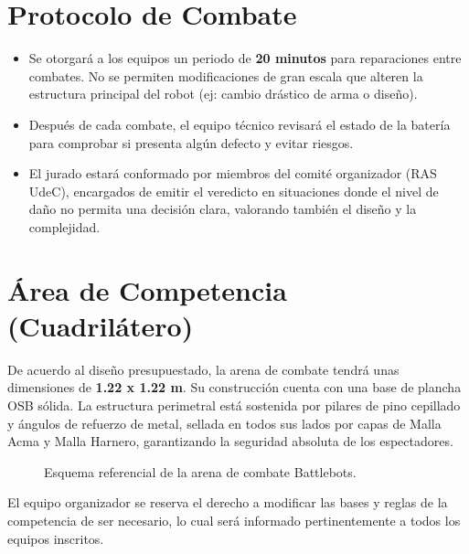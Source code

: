 \documentclass[12pt,a4paper]{article}
\begin{document}
\section*{Protocolo de Combate}
\begin{itemize}
    \item Se otorgará a los equipos un periodo de \textbf{20 minutos} para reparaciones entre combates. No se permiten modificaciones de gran escala que alteren la estructura principal del robot (ej: cambio drástico de arma o diseño).
    \item Después de cada combate, el equipo técnico revisará el estado de la batería para comprobar si presenta algún defecto y evitar riesgos.
    \item El jurado estará conformado por miembros del comité organizador (RAS UdeC), encargados de emitir el veredicto en situaciones donde el nivel de daño no permita una decisión clara, valorando también el diseño y la complejidad.
\end{itemize}

\section*{Área de Competencia (Cuadrilátero)}
De acuerdo al diseño presupuestado, la arena de combate tendrá unas dimensiones de \textbf{1.22 x 1.22 m}. 
Su construcción cuenta con una base de plancha OSB sólida. La estructura perimetral está sostenida por pilares de pino cepillado y ángulos de refuerzo de metal, sellada en todos sus lados por capas de Malla Acma y Malla Harnero, garantizando la seguridad absoluta de los espectadores.

\begin{figure}[h]
\centering
{}
\caption{Esquema referencial de la arena de combate Battlebots.}
\end{figure}

\vspace{1cm}
\noindent El equipo organizador se reserva el derecho a modificar las bases y reglas de la competencia de ser necesario, lo cual será informado pertinentemente a todos los equipos inscritos.
\end{document}
